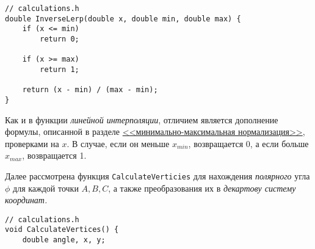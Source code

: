 \documentclass[14pt]{extarticle}
\begin{document}
{    \begin{lstlisting}
// calculations.h
double InverseLerp(double x, double min, double max) {
	if (x <= min)
		return 0;

	if (x >= max)
		return 1;

	return (x - min) / (max - min);
}\end{lstlisting}

    \begin{spacing}{1.5}
        Как и в функции \textit{линейной интерполяции}, отличием является дополнение формулы, описанной в разделе \hyperref[sec:minmaxnorm]{<<минимально-максимальная нормализация>>}, проверками на $x$. В случае, если он меньше $x_{min}$, возвращается 0, а если больше $x_{max}$, возвращается 1.
        \par
        \label{sec:calcverts}
        Далее рассмотрена функция \verb|CalculateVerticies| для нахождения \textit{полярного} угла $\phi$ для каждой точки $A, B, C$, а также преобразования их в \textit{декартову систему координат.}
    \end{spacing}

    \begin{lstlisting}
// calculations.h
void CalculateVertices() {
	double angle, x, y;


\end{lstlisting}}
\end{document}
